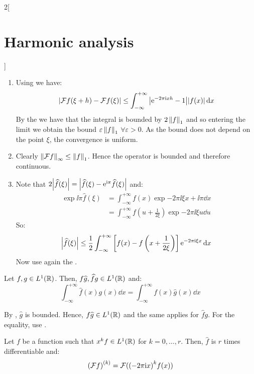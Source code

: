 \documentclass[../../../main_math.tex]{subfiles}
\begin{document}
\begin{multicols}{2}[\section{Harmonic analysis}]
\begin{theorem}
\begin{enumerate}
    \end{enumerate}
  \end{theorem}
  \begin{sproof}
    \begin{enumerate}
      \item Using  we have:
            $$\abs{\mathcal{F} f(\xi+h)-\mathcal{F} f(\xi)}\leq \int_{-\infty}^{+\infty}\abs{\mathrm{e}^{-2\pi\mathrm{i} x h}-1}\abs{f(x)}\dd{x}$$
            By the  we have that the integral is bounded by $2\left\|f\right\|_1$ and so entering the limit we obtain the bound $\varepsilon \left\|f\right\|_1$ $\forall \varepsilon>0$. As the bound does not depend on the point $\xi$, the convergence is uniform.
      \item Clearly $\left\|\mathcal{F} f\right\|_{\infty}\leq \left\|f\right\|_1$. Hence the operator is bounded and therefore continuous.
      \item Note that $2\abs{\widehat{f}(\xi)}=\abs{\widehat{f}(\xi)-\mathrm{e}^{\mathrm{i}\pi}\widehat{f}(\xi)}$ and:
            \begin{align*}
              \exp{\ii\pi}\widehat{f}(\xi) & =\int_{-\infty}^{+\infty}f(x)\exp{-2\pi\ii\xi x+\ii\pi}\dd{x}                    \\
                                           & =\int_{-\infty}^{+\infty}f\left(u+\frac{1}{2\xi}\right)\exp{-2\pi\ii\xi u}\dd{u}
            \end{align*}
            So: $$\abs{\widehat{f}(\xi)}\leq\frac{1}{2}\int_{-\infty}^{+\infty}\left[f(x)-f\left(x+\frac{1}{2\xi}\right)\right]\mathrm{e}^{-2\pi\mathrm{i}\xi x}\dd{x}$$
            Now use again the .
    \end{enumerate}
  \end{sproof}
  \begin{proposition}\label{HA:symmetryFT}
    Let $f,g\in L^1(\mathbb{R})$. Then, $f\widehat{g},\widehat{f}g\in L^1(\mathbb{R})$ and:
    $$\int_{-\infty}^{+\infty}\widehat{f}(x)g(x)\dd{x}=\int_{-\infty}^{+\infty}f(x)\widehat{g}(x)\dd{x}$$
  \end{proposition}
  \begin{sproof}
    By , $\widehat{g}$ is bounded. Hence, $f\widehat{g}\in L^1(\mathbb{R})$ and the same applies for $\widehat{f}g$. For the equality, use .
  \end{sproof}
  \begin{proposition}\label{HA:diffFourierXf}
    Let $f$ be a function such that $x^k f\in L^1(\mathbb{R})$ for $k=0,\ldots,r$. Then, $\widehat{f}$ is $r$ times differentiable and:
    $${(\mathcal{F} f)}^{(k)}=\mathcal{F}({(-2\pi\mathrm{i} x)}^kf(x))$$

\end{proposition}
\end{multicols}
\end{document}

